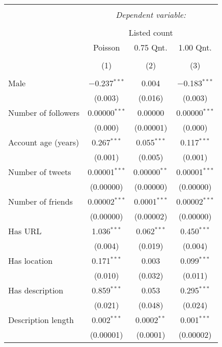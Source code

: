 
\begin{table}[!htbp] \centering 
  \caption{} 
  \label{} 
\begin{tabular}{@{\extracolsep{5pt}}lccc} 
\\[-1.8ex]\hline 
\hline \\[-1.8ex] 
 & \multicolumn{3}{c}{\textit{Dependent variable:}} \\ 
\cline{2-4} 
\\[-1.8ex] & \multicolumn{3}{c}{Listed count} \\ 
 & Poisson & 0.75 Qnt. & 1.00 Qnt. \\ 
\\[-1.8ex] & (1) & (2) & (3)\\ 
\hline \\[-1.8ex] 
 Male & $-$0.237$^{***}$ & 0.004 & $-$0.183$^{***}$ \\ 
  & (0.003) & (0.016) & (0.003) \\ 
  Number of followers & 0.00000$^{***}$ & 0.00000 & 0.00000$^{***}$ \\ 
  & (0.000) & (0.00001) & (0.000) \\ 
  Account age (years) & 0.267$^{***}$ & 0.055$^{***}$ & 0.117$^{***}$ \\ 
  & (0.001) & (0.005) & (0.001) \\ 
  Number of tweets & 0.00001$^{***}$ & 0.00000$^{**}$ & 0.00001$^{***}$ \\ 
  & (0.00000) & (0.00000) & (0.00000) \\ 
  Number of friends & 0.00002$^{***}$ & 0.0001$^{***}$ & 0.00002$^{***}$ \\ 
  & (0.00000) & (0.00002) & (0.00000) \\ 
  Has URL & 1.036$^{***}$ & 0.062$^{***}$ & 0.450$^{***}$ \\ 
  & (0.004) & (0.019) & (0.004) \\ 
  Has location & 0.171$^{***}$ & 0.003 & 0.099$^{***}$ \\ 
  & (0.010) & (0.032) & (0.011) \\ 
  Has description & 0.859$^{***}$ & 0.053 & 0.295$^{***}$ \\ 
  & (0.021) & (0.048) & (0.024) \\ 
  Description length & 0.002$^{***}$ & 0.0002$^{**}$ & 0.001$^{***}$ \\ 
  & (0.00001) & (0.0001) & (0.00002) \\ 

\end{tabular}
\end{table}
